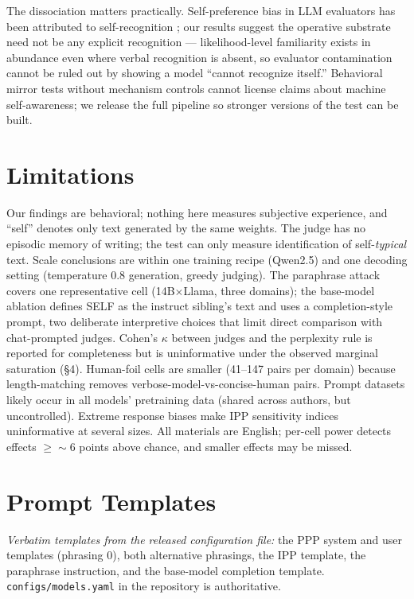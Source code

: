 \documentclass[11pt]{article}
\begin{document}
The dissociation matters practically. Self-preference bias in LLM
evaluators has been attributed to self-recognition
\citep{panickssery2024llm}; our results suggest the operative substrate
need not be any explicit recognition --- likelihood-level familiarity
exists in abundance even where verbal recognition is absent, so evaluator
contamination cannot be ruled out by showing a model ``cannot recognize
itself.'' Behavioral mirror tests without mechanism controls cannot
license claims about machine self-awareness; we release the full pipeline
so stronger versions of the test can be built.

\section*{Limitations}
Our findings are behavioral; nothing here measures subjective experience,
and ``self'' denotes only text generated by the same weights. The judge
has no episodic memory of writing; the test can only measure
identification of self-\emph{typical} text. Scale conclusions are within
one training recipe (Qwen2.5) and one decoding setting (temperature 0.8
generation, greedy judging). The paraphrase attack covers one
representative cell (14B$\times$Llama, three domains); the base-model
ablation defines SELF as the instruct sibling's text and uses a
completion-style prompt, two deliberate interpretive choices that limit
direct comparison with chat-prompted judges. Cohen's $\kappa$ between
judges and the perplexity rule is reported for completeness but is
uninformative under the observed marginal saturation (\S4). Human-foil
cells are smaller (41--147 pairs per domain) because length-matching removes verbose-model-vs-concise-human
pairs. Prompt datasets likely occur in all models' pretraining data
(shared across authors, but uncontrolled). Extreme response biases make
IPP sensitivity indices uninformative at several sizes. All materials are
English; per-cell power detects effects $\geq{\sim}6$ points above chance,
and smaller effects may be missed.




\appendix

\section{Prompt Templates}\label{app:prompts}
\emph{Verbatim templates from the released configuration file:} the PPP
system and user templates (phrasing 0), both alternative phrasings, the
IPP template, the paraphrase instruction, and the base-model completion
template. \texttt{configs/models.yaml} in the repository is authoritative.
\end{document}
